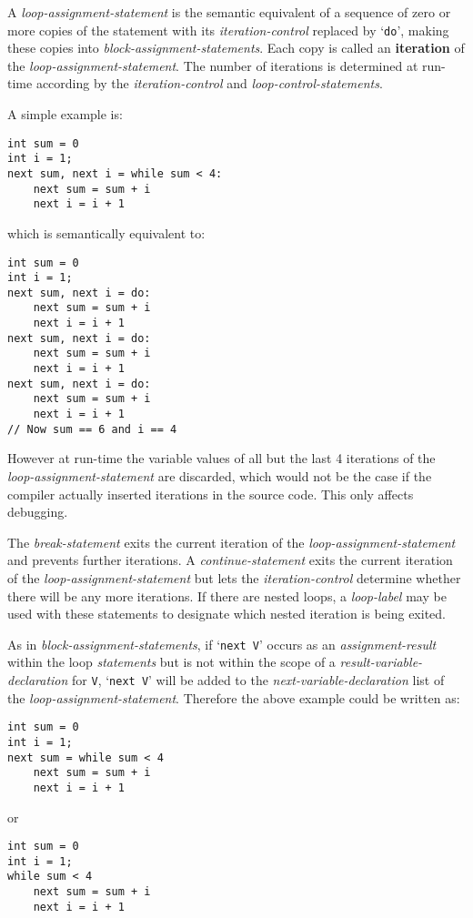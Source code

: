 \documentclass[12pt]{article}
\newcommand{\key}[1]{{\rm \bfseries #1}}
\newenvironment{indpar}[1][0.3in]%
	{\begin{list}{}%
		     {\setlength{\itemsep}{0in}%
		      \setlength{\topsep}{0in}%
		      \setlength{\parsep}{1ex}%
		      \setlength{\labelwidth}{#1}%
		      \setlength{\leftmargin}{#1}%
		      \addtolength{\leftmargin}{\labelsep}}%
	 \item}%
	{\end{list}}
\begin{document}
A {\em loop-assignment-statement} is the semantic equivalent of
a sequence of zero or more copies of the statement with
its {\em iteration-control} replaced by `{\tt do}', making these copies into
{\em block-assignment-statements}.  Each copy is called an
\key{iteration} of the {\em loop-assignment-statement}.
The number of iterations is
determined at run-time according by the {\em iteration-control}
and {\em loop-control-statements}.

A simple example is:
\begin{indpar}\begin{verbatim}
int sum = 0
int i = 1;
next sum, next i = while sum < 4:
    next sum = sum + i
    next i = i + 1
\end{verbatim}\end{indpar}
which is semantically equivalent to:
\begin{indpar}\begin{verbatim}
int sum = 0
int i = 1;
next sum, next i = do:
    next sum = sum + i
    next i = i + 1
next sum, next i = do:
    next sum = sum + i
    next i = i + 1
next sum, next i = do:
    next sum = sum + i
    next i = i + 1
// Now sum == 6 and i == 4
\end{verbatim}\end{indpar}

However at run-time the variable values of all but the
last 4 iterations of the {\em loop-assignment-statement}
are discarded, which would not be the case if the compiler
actually inserted iterations in the source code. 
This only affects debugging.

The {\em break-statement} exits the current iteration of the
{\em loop-assignment-statement} and prevents further iterations.
A {\em continue-statement} exits the current iteration of the
{\em loop-assignment-statement} but lets the
{\em iteration-control} determine whether there will be any
more iterations.  If there are nested loops, a {\em loop-label}
may be used with these statements to designate which nested iteration
is being exited.

As in {\em block-assignment-statements}, if `{\tt next V}' occurs
as an {\em assignment-result} within the loop {\em statements}
but is not within the scope of a {\em result-variable-declaration}
for {\tt V}, `{\tt next V}' will be added to the {\em next-variable-declaration}
list of the {\em loop-assignment-statement}.  Therefore the
above example could be written as:
\begin{indpar}\begin{verbatim}
int sum = 0
int i = 1;
next sum = while sum < 4
    next sum = sum + i
    next i = i + 1
\end{verbatim}\end{indpar}
or
\begin{indpar}\begin{verbatim}
int sum = 0
int i = 1;
while sum < 4
    next sum = sum + i
    next i = i + 1
\end{verbatim}\end{indpar}
\end{document}
